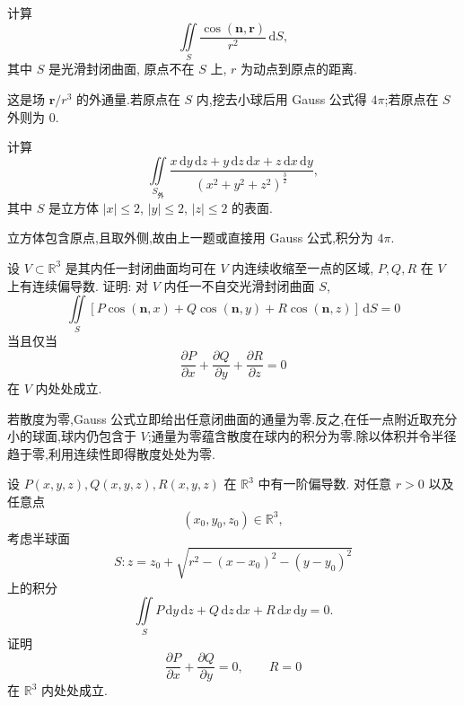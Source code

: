 \begin{example}
    计算
    \[
        \displaystyle\iint\limits_S\dfrac{\cos(\bm n,\bm r)}{r^2}\,\mathrm{d}S,
    \]
    其中 $S$ 是光滑封闭曲面, 原点不在 $S$ 上, $r$ 为动点到原点的距离.
\end{example}
\exampleblank

\begin{solution}
    这是场 $\bm r/r^3$ 的外通量.若原点在 $S$ 内,挖去小球后用 Gauss 公式得 $4\pi$;若原点在 $S$ 外则为 $0$.
\end{solution}

\begin{example}
    计算
    \[
        \displaystyle\iint\limits_{S_{\text{外}}}\dfrac{x\,\mathrm{d}y\,\mathrm{d}z+y\,\mathrm{d}z\,\mathrm{d}x+z\,\mathrm{d}x\,\mathrm{d}y}{(x^2+y^2+z^2)^{\frac{3}{2}}},
    \]
    其中 $S$ 是立方体 $|x|\leq2$, $|y|\leq2$, $|z|\leq2$ 的表面.
\end{example}
\exampleblank

\begin{solution}
    立方体包含原点,且取外侧,故由上一题或直接用 Gauss 公式,积分为 $4\pi$.
\end{solution}

\begin{example}
    设 $V\subset\mathbb{R}^3$ 是其内任一封闭曲面均可在 $V$ 内连续收缩至一点的区域, $P,Q,R$ 在 $V$ 上有连续偏导数. 证明: 对 $V$ 内任一不自交光滑封闭曲面 $S$,
    \[
        \displaystyle\iint\limits_S\left\lbrack P\cos(\bm n,x)+Q\cos(\bm n,y)+R\cos(\bm n,z)\right\rbrack\,\mathrm{d}S=0
    \]
    当且仅当
    \[
        \dfrac{\partial P}{\partial x}+\dfrac{\partial Q}{\partial y}+\dfrac{\partial R}{\partial z}=0
    \]
    在 $V$ 内处处成立.
\end{example}
\exampleblank

\begin{solution}
    若散度为零,Gauss 公式立即给出任意闭曲面的通量为零.反之,在任一点附近取充分小的球面,球内仍包含于 $V$;通量为零蕴含散度在球内的积分为零.除以体积并令半径趋于零,利用连续性即得散度处处为零.
\end{solution}

\begin{example}
    设 $P(x,y,z),Q(x,y,z),R(x,y,z)$ 在 $\mathbb{R}^3$ 中有一阶偏导数. 对任意 $r>0$ 以及任意点
    \[
        (x_0,y_0,z_0)\in\mathbb{R}^3,
    \]
    考虑半球面
    \[
        S:z=z_0+\sqrt{r^2-(x-x_0)^2-(y-y_0)^2}
    \]
    上的积分
    \[
        \displaystyle\iint\limits_S
        P\,\mathrm{d}y\,\mathrm{d}z
        +Q\,\mathrm{d}z\,\mathrm{d}x
        +R\,\mathrm{d}x\,\mathrm{d}y=0.
    \]
    证明
    \[
        \dfrac{\partial P}{\partial x}+\dfrac{\partial Q}{\partial y}=0,
        \qquad R=0
    \]
    在 $\mathbb{R}^3$ 内处处成立.
\end{example}
\exampleblank

